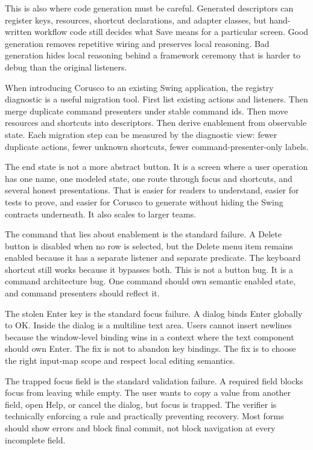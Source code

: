 This is also where code generation must be careful. Generated descriptors can register keys, resources, shortcut declarations, and adapter classes, but hand-written workflow code still decides what Save means for a particular screen. Good generation removes repetitive wiring and preserves local reasoning. Bad generation hides local reasoning behind a framework ceremony that is harder to debug than the original listeners.

When introducing Corusco to an existing Swing application, the registry diagnostic is a useful migration tool. First list existing actions and listeners. Then merge duplicate command presenters under stable command ids. Then move resources and shortcuts into descriptors. Then derive enablement from observable state. Each migration step can be measured by the diagnostic view: fewer duplicate actions, fewer unknown shortcuts, fewer command-presenter-only labels.

The end state is not a more abstract button. It is a screen where a user operation has one name, one modeled state, one route through focus and shortcuts, and several honest presentations. That is easier for readers to understand, easier for tests to prove, and easier for Corusco to generate without hiding the Swing contracts underneath. It also scales to larger teams.

The command that lies about enablement is the standard failure. A Delete button is disabled when no row is selected, but the Delete menu item remains enabled because it has a separate listener and separate predicate. The keyboard shortcut still works because it bypasses both. This is not a button bug. It is a command architecture bug. One command should own semantic enabled state, and command presenters should reflect it.

The stolen Enter key is the standard focus failure. A dialog binds Enter globally to OK. Inside the dialog is a multiline text area. Users cannot insert newlines because the window-level binding wins in a context where the text component should own Enter. The fix is not to abandon key bindings. The fix is to choose the right input-map scope and respect local editing semantics.

The trapped focus field is the standard validation failure. A required field blocks focus from leaving while empty. The user wants to copy a value from another field, open Help, or cancel the dialog, but focus is trapped. The verifier is technically enforcing a rule and practically preventing recovery. Most forms should show errors and block final commit, not block navigation at every incomplete field.

